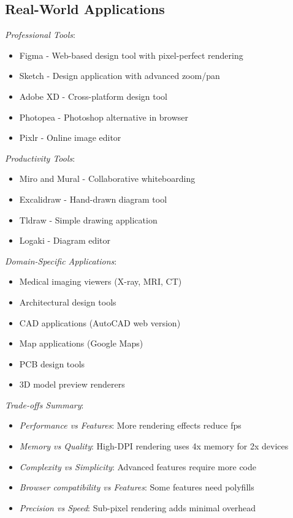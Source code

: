 \documentclass[11pt]{article}
\begin{document}
\subsection{Real-World Applications}
\label{sec:orgb392af0}

\emph{Professional Tools}:

\begin{itemize}
\item Figma - Web-based design tool with pixel-perfect rendering
\item Sketch - Design application with advanced zoom/pan
\item Adobe XD - Cross-platform design tool
\item Photopea - Photoshop alternative in browser
\item Pixlr - Online image editor
\end{itemize}

\emph{Productivity Tools}:

\begin{itemize}
\item Miro and Mural - Collaborative whiteboarding
\item Excalidraw - Hand-drawn diagram tool
\item Tldraw - Simple drawing application
\item Logaki - Diagram editor
\end{itemize}

\emph{Domain-Specific Applications}:

\begin{itemize}
\item Medical imaging viewers (X-ray, MRI, CT)
\item Architectural design tools
\item CAD applications (AutoCAD web version)
\item Map applications (Google Maps)
\item PCB design tools
\item 3D model preview renderers
\end{itemize}

\emph{Trade-offs Summary}:

\begin{itemize}
\item \emph{Performance vs Features}: More rendering effects reduce fps
\item \emph{Memory vs Quality}: High-DPI rendering uses 4x memory for 2x devices
\item \emph{Complexity vs Simplicity}: Advanced features require more code
\item \emph{Browser compatibility vs Features}: Some features need polyfills
\item \emph{Precision vs Speed}: Sub-pixel rendering adds minimal overhead
\end{itemize}
\end{document}
